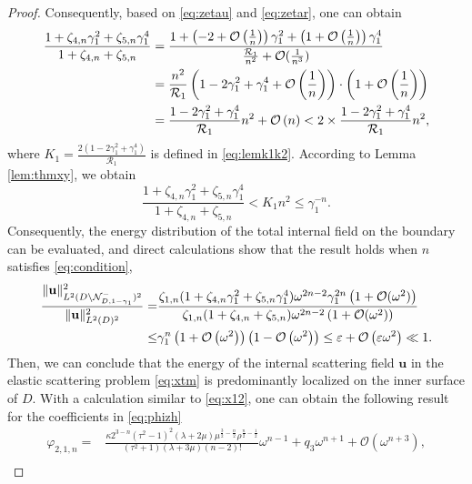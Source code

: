 \documentclass[10pt,a4paper]{amsart}
\newcommand{\bu}{\mathbf{u}}
\begin{document}
\begin{proof}
	Consequently, based on \eqref{eq:zetau} and \eqref{eq:zetar}, one can obtain 
	\begin{align}
		\frac{1+\zeta _{4,n} \gamma_1 ^{2}+\zeta _{5,n} \gamma_1 ^{4}}{1+\zeta _{4,n}+\zeta _{5,n}}&=\frac{1+\left(-2+\mathcal{O}\left(\frac{1}{n}\right)\right)\gamma_{1}^{2}+\left(1+\mathcal{O}\left(\frac{1}{n}\right)\right)\gamma_{1}^{4}}{\frac{\mathcal{R}_{1}}{n^2}+\mathcal{O}(\frac{1}{n^3})}\notag\\
		&=\frac{n^2}{\mathcal{R}_{1}}\left(1-2\gamma_{1}^2+\gamma_{1}^4+\mathcal{O}\left(\frac{1}{n}\right)\right)\cdot\left(1+\mathcal{O}\left(\frac{1}{n}\right)\right)\notag\\
		&=\frac{1-2\gamma_{1}^2+\gamma_{1}^4}{\mathcal{R}_{1}} n^2+\mathcal{O}\left(n\right)<2 \times \frac{1-2\gamma_{1}^2+\gamma_{1}^4}{\mathcal{R}_{1}} n^2,\notag
	\end{align}  
	where $K_{1} = \frac{2\left(1 - 2\gamma_{1}^2 + \gamma_{1}^4\right)}{\mathcal{R}_{1}}$ is defined in \eqref{eq:lemk1k2}. According to Lemma \ref{lem:thmxy}, we obtain
	\[\frac{1+\zeta _{4,n} \gamma_1 ^{2}+\zeta _{5,n} \gamma_1 ^{4}}{1+\zeta _{4,n}+\zeta _{5,n}}<K_{1}n^2\leq\gamma_1^{-n}.\]
	Consequently, the energy distribution of the total internal field on the boundary can be evaluated, and direct calculations show that the result holds when $n$ satisfies \eqref{eq:condition},
	\begin{align}
		\frac{\|\mathbf{u}\|_{L^2(D \setminus \mathcal{N}_{D,1-\gamma_{1}}^{-})^2}^2}{\|\mathbf{u}\|_{L^2(D)^2}^2}=
		&\frac{\zeta _{1,n}(1 +\zeta _{4,n} \gamma_1 ^{2}+\zeta _{5,n} \gamma_1 ^{4})\omega ^{2n-2}\gamma_1 ^{2n}\left(1+\mathcal{O}( \omega^{2})\right)}{\zeta _{1,n}(1 +\zeta _{4,n} +\zeta _{5,n} )\omega ^{2n-2}\left(1+\mathcal{O}(\omega^{2})\right)}\notag\\
		\leq&\gamma_1^{n}\left(1+\mathcal{O}\left(\omega^2\right)\right)\left(1-\mathcal{O}\left(\omega^2\right)\right)\leq\varepsilon+\mathcal{O}\left(\varepsilon\omega^2\right)\ll1.\notag
	\end{align}
	Then, we can conclude that the energy of the internal scattering field $\bu$ in the elastic scattering problem \eqref{eq:xtm} is predominantly localized on the inner surface of $D$.
	With a calculation similar to \eqref{eq:x12}, one can obtain the following result for the coefficients in \eqref{eq:phizh}
	\begin{align}\label{eq:phi212}
		\varphi _{2,1,n}=&\frac{\kappa2^{3-n} \left(\tau ^2-1\right)^2 (\lambda +2 \mu ) \mu ^{\frac{3}{2}-\frac{n}{2}} \rho ^{\frac{n}{2}-\frac{1}{2}}}{\left(\tau ^2+1\right) (\lambda +3 \mu ) (n-2)!}\omega ^{n-1}+q_{3}\omega ^{n+1}+ \mathcal{O}(\omega^{n+3}),\\

\end{align}
\end{proof}
\end{document}

